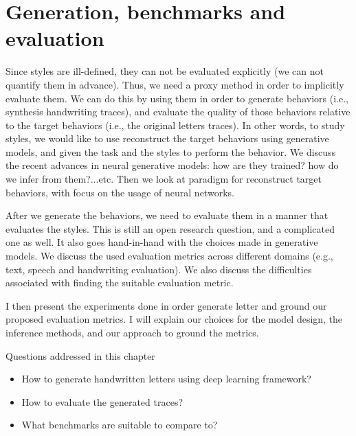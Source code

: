 \chapter{Generation, benchmarks and evaluation}\label{ch:GBEM}

\minitoc%

\par Since styles are ill-defined, they can not be evaluated explicitly (we can not quantify them in advance). Thus, we need a proxy method in order to implicitly evaluate them. We can do this by using them in order to generate behaviors (i.e., synthesis handwriting traces), and evaluate the quality of those behaviors relative to the target behaviors (i.e., the original letters traces). In other words, to study styles, we would like to use reconstruct the target behaviors using generative models, and given the task and the styles to perform the behavior. We discuss the recent advances in neural generative models: how are they trained? how do we infer from them?...etc. Then we look at paradigm for reconstruct target behaviors, with focus on the usage of neural networks.

\par After we generate the behaviors, we need to evaluate them in a manner that evaluates the styles. This is still an open research question, and a complicated one as well. It also goes hand-in-hand with the choices made in generative models. We discuss the used evaluation metrics across different domains (e.g., text, speech and handwriting evaluation). We also discuss the difficulties associated with finding the suitable evaluation metric.

\par I then present the experiments done in order generate letter and ground our proposed evaluation metrics. I will explain our choices for the model design, the inference methods, and our approach to ground the metrics.


\begin{mdframed}[backgroundcolor=blue!20]
    \begin{center}
        Questions addressed in this chapter
    \end{center}

    \begin{itemize}[noitemsep]
        \item How to generate handwritten letters using deep learning framework?
        \item How to evaluate the generated traces?
        \item What benchmarks are suitable to compare to?
    \end{itemize}
\end{mdframed}

